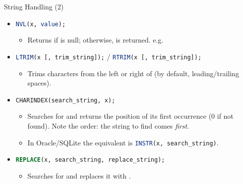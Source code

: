\documentclass{beamer}
\begin{document}
\begin{frame}[fragile]{String Handling (2)}
\begin{itemize}
  \item \lstinline[language=SQL]|NVL(x, value);|
  \begin{itemize}
    \item Returns  if  is null; otherwise,  is returned.
          \quad e.g.\ 
  \end{itemize}
  \vspace{0.4em}
  \item \lstinline[language=SQL]|LTRIM(x [, trim_string]);| / \lstinline[language=SQL]|RTRIM(x [, trim_string]);|
  \begin{itemize}
    \item Trims characters from the left or right of 
          (by default, leading/trailing spaces).
  \end{itemize}
  \vspace{0.4em}
  \item \lstinline[language=SQL]|CHARINDEX(search_string, x);|
  \begin{itemize}
    \item Searches  for  and returns the position of its first
          occurrence (0 if not found). Note the order: the string to find comes \emph{first}.
    \item In Oracle/SQLite the equivalent is \lstinline[language=SQL]|INSTR(x, search_string)|.
  \end{itemize}
  \vspace{0.4em}
  \item \lstinline[language=SQL]|REPLACE(x, search_string, replace_string);|
  \begin{itemize}
    \item Searches  for  and replaces it with .
  \end{itemize}
\end{itemize}
\end{frame}
\end{document}
